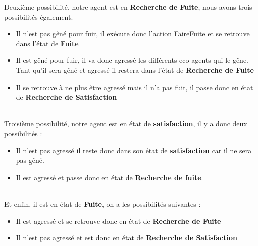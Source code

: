             Deuxième possibilité, notre agent est en \textbf{Recherche de Fuite}, nous avons trois possibilités également. \\
            \begin{itemize}
                \item Il n'est pas gêné pour fuir, il exécute donc l'action FaireFuite et se retrouve dans l'état de \textbf{Fuite}
                \item Il est gêné pour fuir, il va donc agressé les différents eco-agents qui le gêne. Tant qu'il sera gêné et agressé il restera dans l'état de \textbf{Recherche de Fuite}
                \item Il se retrouve à ne plus être agressé mais il n'a pas fuit, il passe donc en état de \textbf{Recherche de Satisfaction} 
            \end{itemize}~\\

            Troisième possibilité, notre agent est en état de \textbf{satisfaction}, il y a donc deux possibilités :\\
            \begin{itemize}
                \item Il n'est pas agressé il reste donc dans son état de \textbf{satisfaction} car il ne sera pas gêné.
                \item Il est agressé et passe donc en état de \textbf{Recherche de fuite}. 
            \end{itemize}~\\

            Et enfin, il est en état de \textbf{Fuite}, on a les possibilités suivantes :
            \begin{itemize}
                \item Il est agressé et se retrouve donc en état de \textbf{Recherche de Fuite}
                \item Il n'est pas agressé et est donc en état de \textbf{Recherche de Satisfaction}
        \end{itemize}
